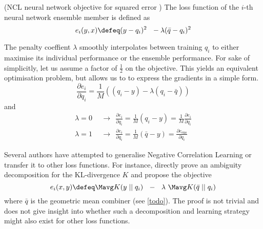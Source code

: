 \documentclass[../main.tex]{subfiles}
\begin{document}
\begin{definition} (NCL neural network objective for squared error \cite{brown_ManagingDiversityRegression_2005}) The loss function of the $i$-th neural network ensemble member is defined as
$$
e_{i}(y,x) \defeq (y - q_i)^2 ~ ~ - \lambda (\bar{q} - q_i)^2
$$
\end{definition}
The penalty coeffient $\lambda$ smoothly interpolates between training $q_{i}$ to either maximise its individual performance or the ensemble performance. For sake of simplicitly, let us assume a factor of $\frac{1}{2}$ on the objective. This yields an equivalent optimisation problem, but allows us to to express the gradients in a simple form.
$$
\frac{\partial e_{i}}{\partial q_{i}} = \frac{1}{M}
\left(
(q_{i}-y) - \lambda (q_{i} - \bar{q})
\right)
$$
and
$$
\begin{align}
\lambda = 0 ~~&\rightarrow~~ \frac{\partial e_{i}}{\partial q_{i}} = \frac{1}{M}(q_{i}-y) = \frac{1}{M} \frac{\partial e_{i}}{\partial q_{i}} \\
\lambda = 1 ~~&\rightarrow~~ \frac{\partial e_{i}}{\partial q_{i}} = \frac{1}{M}(\bar{q} - y) = \frac{\partial e_{\text{ens}}}{\partial q_{i}}
\end{align}
$$

Several authors have attempted to generalise Negative Correlation Learning or transfer it to other loss functions. For instance, \cite{webb21} directly prove an ambiguity decomposition for the KL-divergence $K$ and propose the objective
$$
e_{i}(x,y) \defeq \Mavg K(y \mid\mid q_{i}) ~ ~ - ~ ~ \lambda ~ \Mavg K(\bar{q} \mid\mid q_{i})
$$
where $\bar{q}$ is the geometric mean combiner (see \ref{todo}). The proof is not trivial and does not give insight into whether such a decomposition and learning strategy might also exist for other loss functions.
\end{document}
